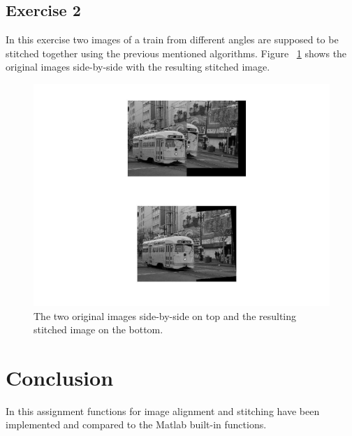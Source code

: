 \documentclass[11pt]{article}
\begin{document}
\subsection{Exercise 2}
In this exercise two images of a train from different angles are supposed to be stitched together using the previous mentioned algorithms. Figure ~\ref{stitched} shows the original images side-by-side with the resulting stitched image.

\begin{figure}[h!]
\begin{flushleft}
\includegraphics[scale=0.4]{../out/stich.jpg}
\caption{The two original images side-by-side on top and the resulting stitched image on the bottom.}
\label{stitched}
\end{flushleft}
\end{figure}

\section{Conclusion}
In this assignment functions for image alignment and stitching have been implemented and compared to the Matlab built-in functions. 
\end{document}
